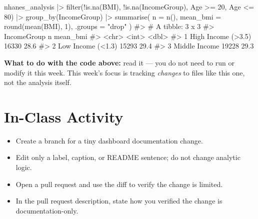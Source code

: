 \documentclass[
  letterpaper,
  DIV=11,
  numbers=noendperiod,
  oneside]{scrreprt}
\newenvironment{Shaded}{\begin{snugshade}}{\end{snugshade}}
\newcommand{\AttributeTok}[1]{\textcolor[rgb]{0.40,0.45,0.13}{#1}}
\newcommand{\CommentTok}[1]{\textcolor[rgb]{0.37,0.37,0.37}{#1}}
\newcommand{\DecValTok}[1]{\textcolor[rgb]{0.68,0.00,0.00}{#1}}
\newcommand{\FunctionTok}[1]{\textcolor[rgb]{0.28,0.35,0.67}{#1}}
\newcommand{\NormalTok}[1]{\textcolor[rgb]{0.00,0.23,0.31}{#1}}
\newcommand{\SpecialCharTok}[1]{\textcolor[rgb]{0.37,0.37,0.37}{#1}}
\newcommand{\StringTok}[1]{\textcolor[rgb]{0.13,0.47,0.30}{#1}}
\providecommand{\tightlist}{%
  \setlength{\itemsep}{0pt}\setlength{\parskip}{0pt}}
\begin{document}
\begin{Shaded}
\begin{Highlighting}[numbers=left,,]
\NormalTok{nhanes\_analysis }\SpecialCharTok{|\textgreater{}}
  \FunctionTok{filter}\NormalTok{(}\SpecialCharTok{!}\FunctionTok{is.na}\NormalTok{(BMI), }\SpecialCharTok{!}\FunctionTok{is.na}\NormalTok{(IncomeGroup), Age }\SpecialCharTok{\textgreater{}=} \DecValTok{20}\NormalTok{, Age }\SpecialCharTok{\textless{}=} \DecValTok{80}\NormalTok{) }\SpecialCharTok{|\textgreater{}}
  \FunctionTok{group\_by}\NormalTok{(IncomeGroup) }\SpecialCharTok{|\textgreater{}}
  \FunctionTok{summarise}\NormalTok{(}
    \AttributeTok{n =} \FunctionTok{n}\NormalTok{(),}
    \AttributeTok{mean\_bmi =} \FunctionTok{round}\NormalTok{(}\FunctionTok{mean}\NormalTok{(BMI), }\DecValTok{1}\NormalTok{),}
    \AttributeTok{.groups =} \StringTok{"drop"}
\NormalTok{  )}
\CommentTok{\#\textgreater{} \# A tibble: 3 x 3}
\CommentTok{\#\textgreater{}   IncomeGroup            n mean\_bmi}
\CommentTok{\#\textgreater{}   \textless{}chr\textgreater{}              \textless{}int\textgreater{}    \textless{}dbl\textgreater{}}
\CommentTok{\#\textgreater{} 1 High Income (\textgreater{}3.5) 16330     28.6}
\CommentTok{\#\textgreater{} 2 Low Income (\textless{}1.3)  15293     29.4}
\CommentTok{\#\textgreater{} 3 Middle Income      19228     29.3}
\end{Highlighting}
\end{Shaded}

\textbf{What to do with the code above:} read it --- you do not need to
run or modify it this week. This week's focus is tracking \emph{changes}
to files like this one, not the analysis itself.

\section*{In-Class Activity}\label{in-class-activity-3}


\begin{itemize}
\tightlist
\item
  Create a branch for a tiny dashboard documentation change.
\item
  Edit only a label, caption, or README sentence; do not change analytic
  logic.
\item
  Open a pull request and use the diff to verify the change is limited.
\item
  In the pull request description, state how you verified the change is
  documentation-only.
\end{itemize}
\end{document}
